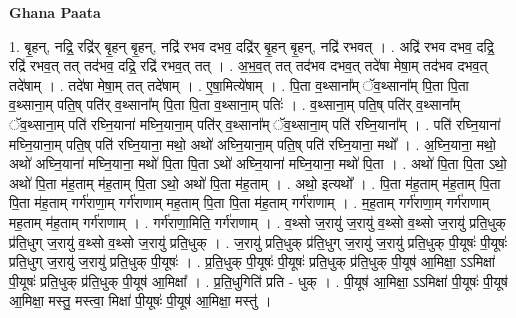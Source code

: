 \documentclass[17pt]{extarticle}
\begin{document}
\textbf{Ghana Paata } \newline

1. बृ॒हन्, नद्रि॒ रद्रि॑र् बृ॒हन् बृ॒हन्, नद्रि॑ रभव दभव॒ दद्रि॑र् बृ॒हन् बृ॒हन्, नद्रि॑ रभवत् । . अद्रि॑ रभव दभव॒ दद्रि॒ रद्रि॑ रभव॒त् तत् तद॑भव॒ दद्रि॒ रद्रि॑ रभव॒त् तत् । . अ॒भ॒व॒त् तत् तद॑भव दभव॒त् तदे॑षा मेषा॒म् तद॑भव दभव॒त् तदे॑षाम् । . तदे॑षा मेषा॒म् तत् तदे॑षाम् । . ए॒षा॒मित्ये॑षाम् । . पि॒ता व॒थ्साना᳚म् ॅव॒थ्साना᳚म् पि॒ता पि॒ता व॒थ्साना॒म् पति॒ष् पति॑र् व॒थ्साना᳚म् पि॒ता पि॒ता व॒थ्साना॒म् पतिः॑ । . व॒थ्साना॒म् पति॒ष् पति॑र् व॒थ्साना᳚म् ॅव॒थ्साना॒म् पति॑ रघ्नि॒याना॑ मघ्नि॒याना॒म् पति॑र् व॒थ्साना᳚म् ॅव॒थ्साना॒म् पति॑ रघ्नि॒याना᳚म् । . पति॑ रघ्नि॒याना॑ मघ्नि॒याना॒म् पति॒ष् पति॑ रघ्नि॒याना॒ मथो॒ अथो॑ अघ्नि॒याना॒म् पति॒ष् पति॑ रघ्नि॒याना॒ मथो᳚ । . अ॒घ्नि॒याना॒ मथो॒ अथो॑ अघ्नि॒याना॑ मघ्नि॒याना॒ मथो॑ पि॒ता पि॒ता ऽथो॑ अघ्नि॒याना॑ मघ्नि॒याना॒ मथो॑ पि॒ता । . अथो॑ पि॒ता पि॒ता ऽथो॒ अथो॑ पि॒ता म॑ह॒ताम् म॑ह॒ताम् पि॒ता ऽथो॒ अथो॑ पि॒ता म॑ह॒ताम् । . अथो॒ इत्यथो᳚ । . पि॒ता म॑ह॒ताम् म॑ह॒ताम् पि॒ता पि॒ता म॑ह॒ताम् गर्ग॑राणा॒म् गर्ग॑राणाम् मह॒ताम् पि॒ता पि॒ता म॑ह॒ताम् गर्ग॑राणाम् । . म॒ह॒ताम् गर्ग॑राणा॒म् गर्ग॑राणाम् मह॒ताम् म॑ह॒ताम् गर्ग॑राणाम् । . गर्ग॑राणा॒मिति॒ गर्ग॑राणाम् । . व॒थ्सो ज॒रायु॑ ज॒रायु॑ व॒थ्सो व॒थ्सो ज॒रायु॑ प्रति॒धुक् प्र॑ति॒धुग् ज॒रायु॑ व॒थ्सो व॒थ्सो ज॒रायु॑ प्रति॒धुक् । . ज॒रायु॑ प्रति॒धुक् प्र॑ति॒धुग् ज॒रायु॑ ज॒रायु॑ प्रति॒धुक् पी॒यूषः॑ पी॒यूषः॑ प्रति॒धुग् ज॒रायु॑ ज॒रायु॑ प्रति॒धुक् पी॒यूषः॑ । . प्र॒ति॒धुक् पी॒यूषः॑ पी॒यूषः॑ प्रति॒धुक् प्र॑ति॒धुक् पी॒यूष॑ आ॒मिक्षा॒ ऽऽमिक्षा॑ पी॒यूषः॑ प्रति॒धुक् प्र॑ति॒धुक् पी॒यूष॑ आ॒मिक्षा᳚ । . प्र॒ति॒धुगिति॑ प्रति - धुक् । . पी॒यूष॑ आ॒मिक्षा॒ ऽऽमिक्षा॑ पी॒यूषः॑ पी॒यूष॑ आ॒मिक्षा॒ मस्तु॒ मस्त्वा॒ मिक्षा॑ पी॒यूषः॑ पी॒यूष॑ आ॒मिक्षा॒ मस्तु॑ । \newline
\end{document}

